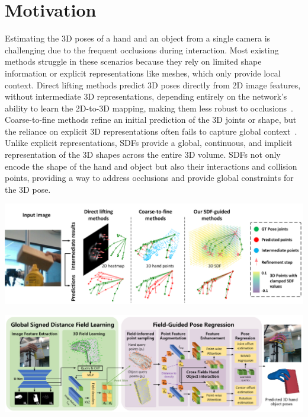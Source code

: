 \documentclass{article}
\begin{document}
\section*{Motivation}

Estimating the 3D poses of a hand and an object from a single camera is challenging due to the frequent occlusions during interaction. Most existing methods struggle in these scenarios because they rely on limited shape information or explicit representations like meshes, which only provide local context. Direct lifting methods predict 3D poses directly from 2D image features, without intermediate 3D representations, depending entirely on the network's ability to learn the 2D-to-3D mapping, making them less robust to occlusions~\cite{kang2024egotap}. Coarse-to-fine methods refine an initial prediction of the 3D joints or shape, but the reliance on explicit 3D representations often fails to capture global context~\cite{cheng2024handdiff}. Unlike explicit representations, SDFs provide a global, continuous, and implicit representation of the 3D shapes across the entire 3D volume. SDFs not only encode the shape of the hand and object but also their interactions and collision points, providing a way to address occlusions and provide global constraints for the 3D pose.

\begin{center}
    \includegraphics[scale=0.4]{hoisdf-2.png}
\end{center}

\begin{center}
    \includegraphics[scale=0.4]{hoisdf-3.png}
\end{center}
\end{document}
